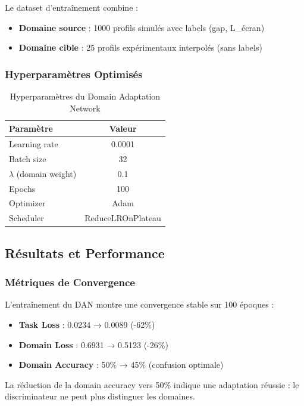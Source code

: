 \documentclass[twocolumn,10pt]{article}
\begin{document}
Le dataset d'entraînement combine :
\begin{itemize}
\item \textbf{Domaine source} : 1000 profils simulés avec labels (gap, L\_écran)
\item \textbf{Domaine cible} : 25 profils expérimentaux interpolés (sans labels)
\end{itemize}

\subsubsection{Hyperparamètres Optimisés}

\begin{table}[H]
\centering
\caption{Hyperparamètres du Domain Adaptation Network}
\begin{tabular}{|l|c|}
\hline
\textbf{Paramètre} & \textbf{Valeur} \\
\hline
Learning rate & 0.0001 \\
Batch size & 32 \\
$\lambda$ (domain weight) & 0.1 \\
Epochs & 100 \\
Optimizer & Adam \\
Scheduler & ReduceLROnPlateau \\
\hline
\end{tabular}
\end{table}

\subsection{Résultats et Performance}

\subsubsection{Métriques de Convergence}

L'entraînement du DAN montre une convergence stable sur 100 époques :

\begin{itemize}
\item \textbf{Task Loss} : 0.0234 → 0.0089 (-62\%)
\item \textbf{Domain Loss} : 0.6931 → 0.5123 (-26\%)
\item \textbf{Domain Accuracy} : 50\% → 45\% (confusion optimale)
\end{itemize}

La réduction de la domain accuracy vers 50\% indique une adaptation réussie : le discriminateur ne peut plus distinguer les domaines.
\end{document}
